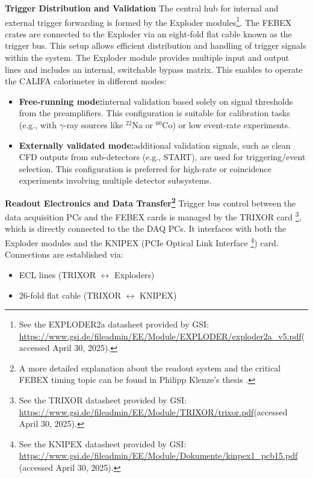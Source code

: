 \textbf{Trigger Distribution and Validation}\newline
The central hub for internal and external trigger forwarding is formed by the Exploder modules\footnote{See the EXPLODER2a datasheet provided by GSI: \url{https://www.gsi.de/fileadmin/EE/Module/EXPLODER/exploder2a\_v5.pdf}(accessed April 30, 2025).}. The FEBEX crates are connected to the Exploder via an eight-fold flat cable known as the trigger bus. This setup allows efficient distribution and handling of trigger signals within the system.\newline
The Exploder module provides multiple input and output lines and includes an internal, switchable bypass matrix. This enables to operate the CALIFA calorimeter in different modes:
\begin{itemize}
\item \textbf{Free-running mode:}internal validation based solely on signal thresholds from the preamplifiers. This configuration is suitable for calibration tasks (e.g., with $\gamma$-ray sources like $^{22}$Na or $^{60}$Co) or low event-rate experiments.
\item \textbf{Externally validated mode:}additional validation signals, such as clean CFD outputs from sub-detectors (e.g., START), are used for triggering/event selection. This configuration is preferred for high-rate or coincidence experiments involving multiple detector subsystems.
\end{itemize}
\textbf{Readout Electronics and Data Transfer\footnote{A more detailed explanation about the readout system and the critical FEBEX timing topic can be found in Philipp Klenze's thesis \cite{pklenze}.}}\newline
Trigger bus control between the data acquisition PCs and the FEBEX cards is managed by the TRIXOR card \footnote{See the TRIXOR datasheet provided by GSI: \url{https://www.gsi.de/fileadmin/EE/Module/TRIXOR/trixor.pdf}(accessed April 30, 2025).}, which is directly connected to the the DAQ PCs. It interfaces with both the Exploder modules and the KNIPEX (PCIe Optical Link Interface \footnote{See the KNIPEX datasheet provided by GSI: \url{https://www.gsi.de/fileadmin/EE/Module/Dokumente/kinpex1\_pcb15.pdf} (accessed April 30, 2025).}) card. Connections are established via:
\begin{itemize}
\item ECL lines (TRIXOR $\leftrightarrow$ Exploders)
\item 26-fold flat cable (TRIXOR $\leftrightarrow$ KNIPEX)
\end{itemize}
